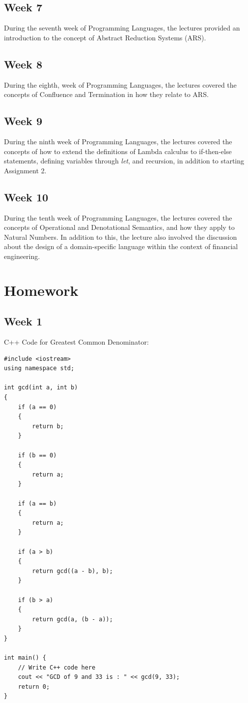 \documentclass{article}
\theoremstyle{theorem}
\theoremstyle{definition}
\theoremstyle{remark}
\begin{document}
\subsection{Week 7} During the seventh week of Programming Languages, the lectures provided an introduction to the concept of Abstract Reduction Systems (ARS).
\subsection{Week 8} During the eighth, week of Programming Languages, the lectures covered the concepts of Confluence and Termination in how they relate to ARS.
\subsection{Week 9} During the ninth week of Programming Languages, the lectures covered the concepts of how to extend the definitions of Lambda calculus to if-then-else statements, defining variables through \textit{let}, and recursion, in addition to starting Assignment 2.
\subsection{Week 10} During the tenth week of Programming Languages, the lectures covered the concepts of Operational and Denotational Semantics, and how they apply to Natural Numbers. In addition to this, the lecture also involved the discussion about the design of a domain-specific language within the context of financial engineering.
\section{Homework}\label{homework}
\subsection{Week 1}

C++ Code for Greatest Common Denominator:
\begin{lstlisting}
#include <iostream>
using namespace std;

int gcd(int a, int b)
{
    if (a == 0)
    {
        return b;
    }

    if (b == 0)
    {
        return a;
    }

    if (a == b)
    {
        return a;
    }

    if (a > b)
    {
        return gcd((a - b), b);
    }

    if (b > a)
    {
        return gcd(a, (b - a));
    }
}

int main() {
    // Write C++ code here
    cout << "GCD of 9 and 33 is : " << gcd(9, 33);
    return 0;
}
\end{lstlisting}
\end{document}
